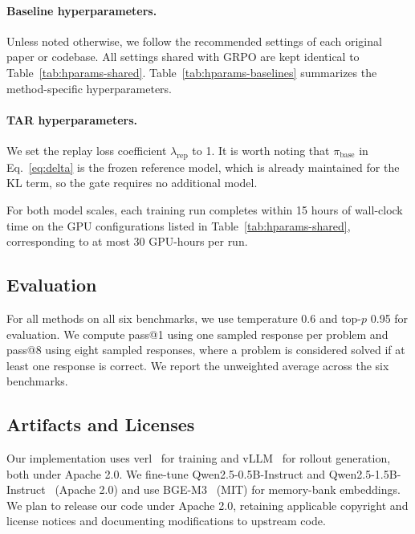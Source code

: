\documentclass[11pt]{article}
\newcommand{\model}{\textsc{TAR}\xspace}
\begin{document}
\paragraph{Baseline hyperparameters.}
Unless noted otherwise, we follow the recommended settings of each original paper or codebase.
All settings shared with GRPO are kept identical to Table~\ref{tab:hparams-shared}.
Table~\ref{tab:hparams-baselines} summarizes the method-specific hyperparameters.

\paragraph{\model hyperparameters.}
We set the replay loss coefficient $\lambda_{\mathrm{rep}}$ to 1.
It is worth noting that $\pi_{\text{base}}$ in Eq.~\eqref{eq:delta} is the frozen reference model, which is already maintained for the KL term, so the gate requires no additional model.

For both model scales, each training run completes within 15 hours of wall-clock time on the GPU configurations listed in Table~\ref{tab:hparams-shared}, corresponding to at most 30 GPU-hours per run.

\subsection{Evaluation}

For all methods on all six benchmarks, we use temperature 0.6 and top-$p$ 0.95 for evaluation.
We compute pass@1 using one sampled response per problem and pass@8 using eight sampled responses, where a problem is considered solved if at least one response is correct.
We report the unweighted average across the six benchmarks.

\subsection{Artifacts and Licenses}

Our implementation uses verl~\cite{sheng2024hybridflow} for training and vLLM~\cite{vllm} for rollout generation, both under Apache 2.0. We fine-tune Qwen2.5-0.5B-Instruct and Qwen2.5-1.5B-Instruct~\cite{qwen25} (Apache 2.0) and use BGE-M3~\cite{chen2024bge} (MIT) for memory-bank embeddings. We plan to release our code under Apache 2.0, retaining applicable copyright and license notices and documenting modifications to upstream code.
\end{document}
